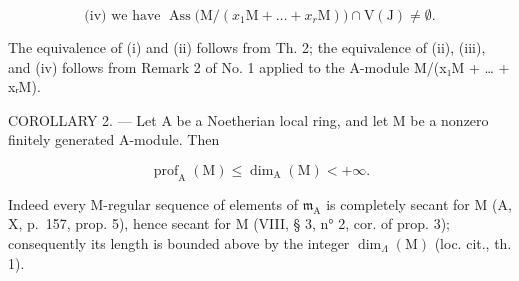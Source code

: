 \[
\text {(iv)} \text {   we have   } \operatorname{Ass} \bigl (\mathrm{M} / (x _ {1} \mathrm{M} + \ldots + x _ {r} \mathrm{M}) \bigr) \cap \mathrm{V} (\mathrm{J}) \neq \emptyset .
\]

The equivalence of (i) and (ii) follows from Th. 2; the equivalence of (ii), (iii), and (iv) follows from Remark 2 of No. 1 applied to the A-module M/(x₁M + \ldots{} + xᵣM).

COROLLARY 2. --- Let A be a Noetherian local ring, and let M be a nonzero finitely generated A-module. Then

\[
\operatorname{prof} _ {\mathrm{A}} (\mathrm{M}) \leqslant \dim_ {\mathrm{A}} (\mathrm{M}) <   + \infty .
\]

Indeed every M-regular sequence of elements of \(\mathfrak{m}_{\mathrm{A}}\) is completely secant for M (A, X, p.~157, prop. 5), hence secant for M (VIII, § 3, n° 2, cor. of prop. 3); consequently its length is bounded above by the integer \(\dim_{\Lambda}(\mathrm{M})\) (loc. cit., th. 1).

